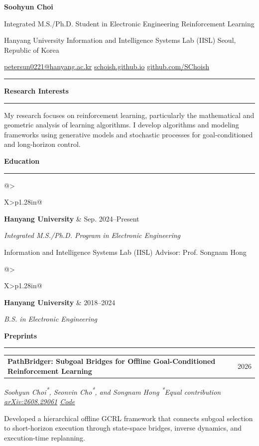 \documentclass[10pt,letterpaper]{article}
\makeatletter
\newcommand{\cvsection}[1]{%
  \par\vspace{2.8pt}%
  {\color{navy}\bfseries\fontsize{11.7}{13.2}\selectfont #1}\par\vspace{0.8pt}
  {\color{rule}\rule{\linewidth}{0.45pt}}\par\vspace{1.5pt}
}
\newcommand{\headingrow}[2]{%
  \begin{tabularx}{\linewidth}{@{}>{\raggedright\arraybackslash}X>{\raggedleft\arraybackslash}p{1.28in}@{}}
    \textbf{#1} & \textcolor{muted}{#2}
  \end{tabularx}\par\vspace{-1.8pt}
}
\newcommand{\researchentry}[4]{%
  \headingrow{#1}{#2}
  {\color{muted}\itshape #3}\par\vspace{0.4pt}
  #4\par\vspace{1.4pt}
}
\makeatother
\begin{document}
\color{ink}
\fontsize{9.5}{10.4}\selectfont

\begin{center}
  {\bfseries\fontsize{26}{29}\selectfont Soohyun Choi}\par\vspace{3pt}
  {\color{muted}\fontsize{10.5}{12.5}\selectfont
    Integrated M.S./Ph.D. Student in Electronic Engineering \textbar{} Reinforcement Learning\par
    Hanyang University \textbullet{} Information and Intelligence Systems Lab (IISL) \textbullet{} Seoul, Republic of Korea
  }\par\vspace{4pt}
  {\fontsize{9.9}{11.6}\selectfont
    \href{mailto:petersun0221@hanyang.ac.kr}{petersun0221@hanyang.ac.kr}
    {\color{rule}\hspace{5pt}\textbar{}\hspace{5pt}}
    \href{https://schoish.github.io/}{schoish.github.io}
    {\color{rule}\hspace{5pt}\textbar{}\hspace{5pt}}
    \href{https://github.com/SChoish}{github.com/SChoish}
  }
\end{center}
\vspace{-2pt}
{\color{navy}\rule{\linewidth}{0.85pt}}

\cvsection{Research Interests}
My research focuses on reinforcement learning, particularly the mathematical and geometric analysis
of learning algorithms. I develop algorithms and modeling frameworks using generative models and
stochastic processes for goal-conditioned and long-horizon control.

\cvsection{Education}
\headingrow{Hanyang University}{Sep. 2024--Present}
\textit{Integrated M.S./Ph.D. Program in Electronic Engineering}\par\vspace{-0.5pt}
{\color{muted}Information and Intelligence Systems Lab (IISL) \textbullet{} Advisor: Prof. Songnam Hong}\par\vspace{2.8pt}
\headingrow{Hanyang University}{2018--2024}
\textit{B.S. in Electronic Engineering}

\cvsection{Preprints}
\researchentry
  {PathBridger: Subgoal Bridges for Offline Goal-Conditioned Reinforcement Learning}
  {2026}
  {Soohyun Choi\textsuperscript{*}, Seonvin Cho\textsuperscript{*}, and Songnam Hong \textbullet{} \textsuperscript{*}Equal contribution \textbullet{} \href{https://arxiv.org/abs/2608.29061}{arXiv:2608.29061} \textbullet{} \href{https://github.com/SChoish/PathBridger}{Code}}
  {Developed a hierarchical offline GCRL framework that connects subgoal selection to short-horizon execution through state-space bridges, inverse dynamics, and execution-time replanning.}
\end{document}
